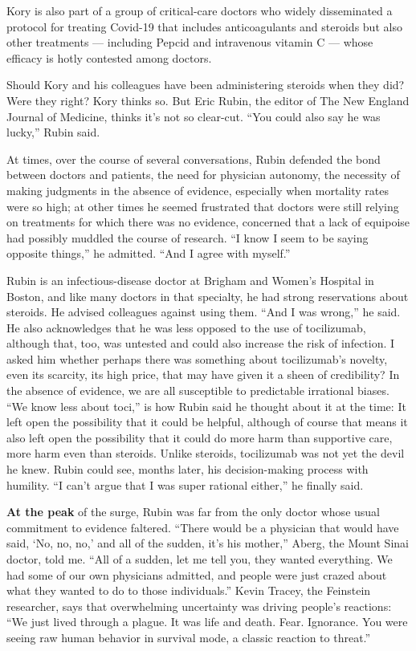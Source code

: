 Kory is also part of a group of critical-care doctors who widely
disseminated a protocol for treating Covid-19 that includes
anticoagulants and steroids but also other treatments --- including
Pepcid and intravenous vitamin C --- whose efficacy is hotly contested
among doctors.

Should Kory and his colleagues have been administering steroids when
they did? Were they right? Kory thinks so. But Eric Rubin, the editor of
The New England Journal of Medicine, thinks it's not so clear-cut. ``You
could also say he was lucky,'' Rubin said.

At times, over the course of several conversations, Rubin defended the
bond between doctors and patients, the need for physician autonomy, the
necessity of making judgments in the absence of evidence, especially
when mortality rates were so high; at other times he seemed frustrated
that doctors were still relying on treatments for which there was no
evidence, concerned that a lack of equipoise had possibly muddled the
course of research. ``I know I seem to be saying opposite things,'' he
admitted. ``And I agree with myself.''

Rubin is an infectious-disease doctor at Brigham and Women's Hospital in
Boston, and like many doctors in that specialty, he had strong
reservations about steroids. He advised colleagues against using them.
``And I was wrong,'' he said. He also acknowledges that he was less
opposed to the use of tocilizumab, although that, too, was untested and
could also increase the risk of infection. I asked him whether perhaps
there was something about tocilizumab's novelty, even its scarcity, its
high price, that may have given it a sheen of credibility? In the
absence of evidence, we are all susceptible to predictable irrational
biases. ``We know less about toci,'' is how Rubin said he thought about
it at the time: It left open the possibility that it could be helpful,
although of course that means it also left open the possibility that it
could do more harm than supportive care, more harm even than steroids.
Unlike steroids, tocilizumab was not yet the devil he knew. Rubin could
see, months later, his decision-making process with humility. ``I can't
argue that I was super rational either,'' he finally said.

\textbf{At the peak} of the surge, Rubin was far from the only doctor
whose usual commitment to evidence faltered. ``There would be a
physician that would have said, `No, no, no,' and all of the sudden,
it's his mother,'' Aberg, the Mount Sinai doctor, told me. ``All of a
sudden, let me tell you, they wanted everything. We had some of our own
physicians admitted, and people were just crazed about what they wanted
to do to those individuals.'' Kevin Tracey, the Feinstein researcher,
says that overwhelming uncertainty was driving people's reactions: ``We
just lived through a plague. It was life and death. Fear. Ignorance. You
were seeing raw human behavior in survival mode, a classic reaction to
threat.''


